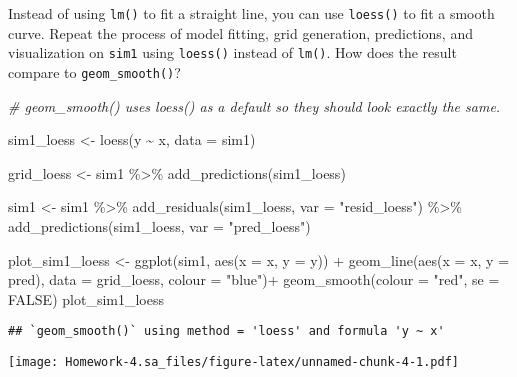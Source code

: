 \documentclass[
]{article}
\newenvironment{Shaded}{\begin{snugshade}}{\end{snugshade}}
\newcommand{\AttributeTok}[1]{\textcolor[rgb]{0.77,0.63,0.00}{#1}}
\newcommand{\CommentTok}[1]{\textcolor[rgb]{0.56,0.35,0.01}{\textit{#1}}}
\newcommand{\ConstantTok}[1]{\textcolor[rgb]{0.00,0.00,0.00}{#1}}
\newcommand{\FunctionTok}[1]{\textcolor[rgb]{0.00,0.00,0.00}{#1}}
\newcommand{\NormalTok}[1]{#1}
\newcommand{\OtherTok}[1]{\textcolor[rgb]{0.56,0.35,0.01}{#1}}
\newcommand{\SpecialCharTok}[1]{\textcolor[rgb]{0.00,0.00,0.00}{#1}}
\newcommand{\StringTok}[1]{\textcolor[rgb]{0.31,0.60,0.02}{#1}}
\begin{document}
Instead of using \texttt{lm()} to fit a straight line, you can use
\texttt{loess()} to fit a smooth curve. Repeat the process of model
fitting, grid generation, predictions, and visualization on
\texttt{sim1} using \texttt{loess()} instead of \texttt{lm()}. How does
the result compare to \texttt{geom\_smooth()}?

\begin{Shaded}
\begin{Highlighting}[]
\CommentTok{\# \textquotesingle{}geom\_smooth()\textquotesingle{} uses \textquotesingle{}loess()\textquotesingle{} as a default so they should look exactly the same. }

\NormalTok{sim1\_loess }\OtherTok{\textless{}{-}} \FunctionTok{loess}\NormalTok{(y }\SpecialCharTok{\textasciitilde{}}\NormalTok{ x, }\AttributeTok{data =}\NormalTok{ sim1)}

\NormalTok{grid\_loess }\OtherTok{\textless{}{-}}\NormalTok{ sim1 }\SpecialCharTok{\%\textgreater{}\%}
  \FunctionTok{add\_predictions}\NormalTok{(sim1\_loess)}

\NormalTok{sim1 }\OtherTok{\textless{}{-}}\NormalTok{ sim1 }\SpecialCharTok{\%\textgreater{}\%}
  \FunctionTok{add\_residuals}\NormalTok{(sim1\_loess, }\AttributeTok{var =} \StringTok{"resid\_loess"}\NormalTok{) }\SpecialCharTok{\%\textgreater{}\%}
  \FunctionTok{add\_predictions}\NormalTok{(sim1\_loess, }\AttributeTok{var =} \StringTok{"pred\_loess"}\NormalTok{)}

\NormalTok{plot\_sim1\_loess }\OtherTok{\textless{}{-}}
  \FunctionTok{ggplot}\NormalTok{(sim1, }\FunctionTok{aes}\NormalTok{(}\AttributeTok{x =}\NormalTok{ x, }\AttributeTok{y =}\NormalTok{ y)) }\SpecialCharTok{+}
  \FunctionTok{geom\_line}\NormalTok{(}\FunctionTok{aes}\NormalTok{(}\AttributeTok{x =}\NormalTok{ x, }\AttributeTok{y =}\NormalTok{ pred), }\AttributeTok{data =}\NormalTok{ grid\_loess, }\AttributeTok{colour =} \StringTok{"blue"}\NormalTok{)}\SpecialCharTok{+}
  \FunctionTok{geom\_smooth}\NormalTok{(}\AttributeTok{colour =} \StringTok{"red"}\NormalTok{, }\AttributeTok{se =} \ConstantTok{FALSE}\NormalTok{)}
\NormalTok{plot\_sim1\_loess}
\end{Highlighting}
\end{Shaded}

\begin{verbatim}
## `geom_smooth()` using method = 'loess' and formula 'y ~ x'
\end{verbatim}

\texttt{[image: Homework-4.sa\_files/figure-latex/unnamed-chunk-4-1.pdf]}
\end{document}

